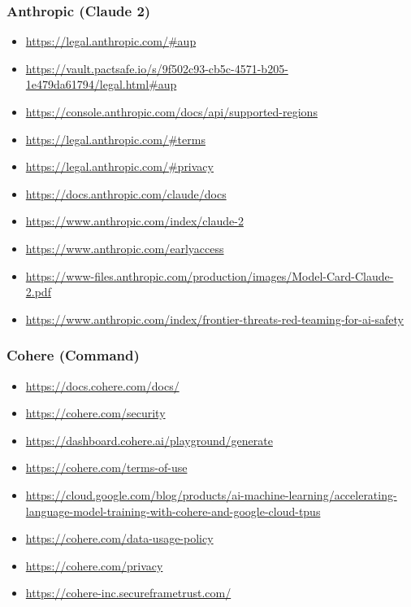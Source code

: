 \subsubsection{Anthropic (Claude 2)}
\begin{itemize}
    \item \url{https://legal.anthropic.com/#aup}
    \item \url{https://vault.pactsafe.io/s/9f502c93-cb5c-4571-b205-1e479da61794/legal.html#aup}
    \item \url{https://console.anthropic.com/docs/api/supported-regions}
    \item \url{https://legal.anthropic.com/#terms}
    \item \url{https://legal.anthropic.com/#privacy}
    \item \url{https://docs.anthropic.com/claude/docs}
    \item \url{https://www.anthropic.com/index/claude-2}
    \item \url{https://www.anthropic.com/earlyaccess}
    \item \url{https://www-files.anthropic.com/production/images/Model-Card-Claude-2.pdf}
    \item \url{https://www.anthropic.com/index/frontier-threats-red-teaming-for-ai-safety}
\end{itemize}

\clearpage

\subsubsection{Cohere (Command)}
\begin{itemize}
    \item \url{https://docs.cohere.com/docs/}
    \item \url{https://cohere.com/security}
    \item \url{https://dashboard.cohere.ai/playground/generate}
    \item \url{https://cohere.com/terms-of-use}
    \item \url{https://cloud.google.com/blog/products/ai-machine-learning/accelerating-language-model-training-with-cohere-and-google-cloud-tpus}
    \item \url{https://cohere.com/data-usage-policy}
    \item \url{https://cohere.com/privacy}
    \item \url{https://cohere-inc.secureframetrust.com/}
\end{itemize}

